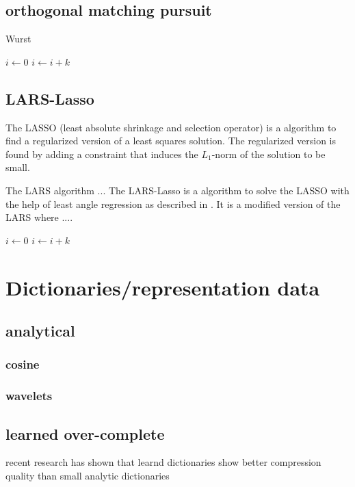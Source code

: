 \subsection{orthogonal matching pursuit}
\label{sec:omp}
\begin{algorithm}
\caption{Wurst}
\begin{algorithmic}
        \STATE $i\gets 0$
\ELSE
                \STATE $i\gets i+k$
        \ENDIF
\ENDIF 
\end{algorithmic}

\subsection{LARS-Lasso}
The LASSO (least absolute shrinkage and selection operator) is a algorithm to find a regularized version of a least squares solution.
The regularized version is found by adding a constraint that induces the $L_1$-norm of the solution to be small.

The LARS algorithm ... \cite{least angle regression}
The LARS-Lasso is a algorithm to solve the LASSO with the help of least angle regression
as described in \cite{Least Angle Regression}. It is a modified version of the LARS where ....

\begin{algorithmic}
        \STATE $i\gets 0$
\ELSE
                \STATE $i\gets i+k$
        \ENDIF
\ENDIF 
\end{algorithmic}
\end{algorithm}

\section{Dictionaries/representation data}
\subsection{analytical}
\subsubsection{cosine}
\subsubsection{wavelets}

\subsection{learned over-complete}
recent research has shown that learnd dictionaries show better compression quality than small analytic dictionaries \cite{Aharon2006} \cite{Chen1998} 


